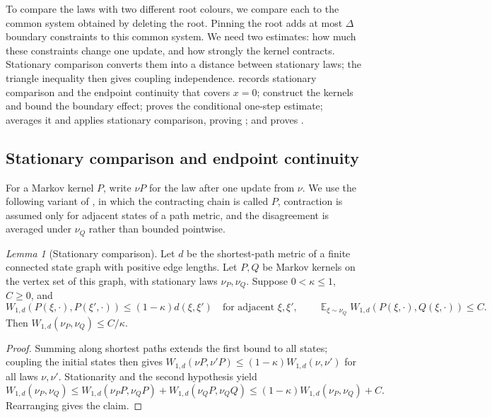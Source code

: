 \documentclass[11pt,reqno]{article}
\theoremstyle{plain}
\newtheorem{lemma}[theorem]{Lemma}
\theoremstyle{definition}
\theoremstyle{remark}
\newtheorem{lemma}[lemma]{Lemma}
\theoremstyle{definition}
\theoremstyle{remark}
\DeclareMathOperator{\E}{\mathbb{E}}
\newcommand{\Deg}{\Delta}                        %
\newcommand{\Wd}{W_{1,d}}                        %
\begin{document}
To compare the laws with two different root colours, we compare each to
the common system obtained by deleting the root.  Pinning the root adds at
most \(\Deg\) boundary constraints to this common system.  We need two estimates: how much these
constraints change one update, and how strongly the kernel contracts.
Stationary comparison converts them into a distance between stationary
laws; the triangle inequality then gives coupling independence.
 records stationary comparison and the
endpoint continuity that covers \(x=0\);
 construct the
kernels and bound the boundary effect;  proves
the conditional one-step estimate;  averages
it and applies stationary comparison, proving
; and 
proves .

\subsection{Stationary comparison and endpoint continuity}
\label{sec:stationary-comparison}

For a Markov kernel \(P\), write \(\nu P\) for the law after one update
from \(\nu\).  We use the following variant of
\cite[Lemma~19]{CFFGZZ2024}, in which the contracting chain is called
\(P\), contraction is assumed only for adjacent states of a path metric,
and the disagreement is averaged under \(\nu_Q\) rather than bounded
pointwise.

\begin{lemma}[Stationary comparison]\label{lem:stationary-comparison}
Let \(d\) be the shortest-path metric of a finite connected state graph
with positive edge lengths.  Let \(P,Q\) be Markov kernels on the vertex
set of this graph, with stationary laws
\(\nu_P,\nu_Q\).  Suppose \(0<\kappa\le1\), \(C\ge0\), and
\[
  \Wd(P(\xi,\cdot),P(\xi',\cdot))\le(1-\kappa)d(\xi,\xi')
  \quad\text{for adjacent }\xi,\xi',
  \qquad
  \E_{\xi\sim\nu_Q}\Wd(P(\xi,\cdot),Q(\xi,\cdot))\le C.
\]
Then \(\Wd(\nu_P,\nu_Q)\le C/\kappa\).
\end{lemma}

\begin{proof}
Summing along shortest paths extends the first bound to all states;
coupling the initial states then gives
\(\Wd(\nu P,\nu' P)\le(1-\kappa)\Wd(\nu,\nu')\) for all laws \(\nu,\nu'\).
Stationarity and the second hypothesis yield
\[
  \Wd(\nu_P,\nu_Q)
  \le\Wd(\nu_PP,\nu_QP)+\Wd(\nu_QP,\nu_QQ)
  \le(1-\kappa)\Wd(\nu_P,\nu_Q)+C.
\]
Rearranging gives the claim.
\end{proof}
\end{document}

